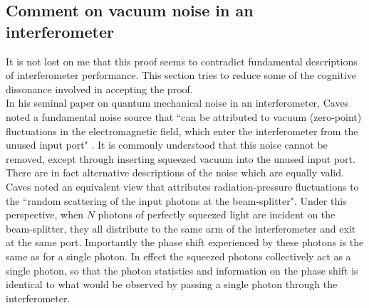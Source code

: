 \documentclass[reqno]{amsart}
\begin{document}


\subsection{Comment on vacuum noise in an interferometer}
It is not lost on me that this proof seems to contradict fundamental descriptions of interferometer performance. This section tries to reduce some of the cognitive dissonance involved in accepting the proof.\\

In his seminal paper on quantum mechanical noise in an interferometer, Caves noted a fundamental noise source that ``can be attributed to vacuum (zero-point) fluctuations in the electromagnetic field, which enter the interferometer from the unused input port" \cite{Caves1981}. It is commonly understood that this noise cannot be removed, except through inserting squeezed vacuum into the unused input port. There are in fact alternative descriptions of the noise which are equally valid. Caves noted an equivalent view that attributes radiation-pressure fluctuations to the ``random scattering of the input photons at the beam-splitter". Under this perspective, when $N$ photons of perfectly squeezed light are incident on the beam-splitter, they all distribute to the same arm of the interferometer and exit at the same port. Importantly the phase shift experienced by these photons is the same as for a single photon. In effect the squeezed photons collectively act as a single photon, so that the photon statistics and information on the phase shift is identical to what would be observed by passing a single photon through the interferometer.
\end{document}
